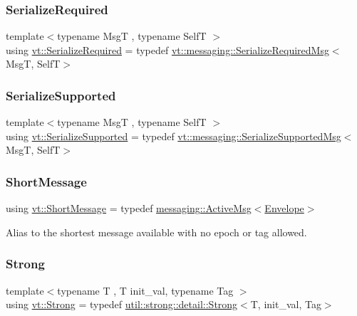 \subsubsection{\texorpdfstring{Serialize\+Required}{SerializeRequired}}
{\footnotesize\ttfamily template$<$typename MsgT , typename SelfT $>$ \\
using \hyperlink{namespacevt_a9e60e2e8929828639383ac1d6643384d}{vt\+::\+Serialize\+Required} = typedef \hyperlink{structvt_1_1messaging_1_1_serialize_required_msg}{vt\+::messaging\+::\+Serialize\+Required\+Msg}$<$MsgT, SelfT$>$}

\mbox{\label{namespacevt_a3862b8e3f67ab03f3a4313d828592fa9}} 
\subsubsection{\texorpdfstring{Serialize\+Supported}{SerializeSupported}}
{\footnotesize\ttfamily template$<$typename MsgT , typename SelfT $>$ \\
using \hyperlink{namespacevt_a3862b8e3f67ab03f3a4313d828592fa9}{vt\+::\+Serialize\+Supported} = typedef \hyperlink{structvt_1_1messaging_1_1_serialize_supported_msg}{vt\+::messaging\+::\+Serialize\+Supported\+Msg}$<$MsgT, SelfT$>$}

\mbox{\label{namespacevt_a1125ac1da6c0bbf141e0ea0739d7602d}} 
\subsubsection{\texorpdfstring{Short\+Message}{ShortMessage}}
{\footnotesize\ttfamily using \hyperlink{namespacevt_a1125ac1da6c0bbf141e0ea0739d7602d}{vt\+::\+Short\+Message} = typedef \hyperlink{structvt_1_1messaging_1_1_active_msg}{messaging\+::\+Active\+Msg}$<$\hyperlink{namespacevt_aa9c8cc094b5361482021d63012987814}{Envelope}$>$}



Alias to the shortest message available with no epoch or tag allowed. 

\mbox{\label{namespacevt_adbd3338278905742eb2de6db590fd2f1}} 
\subsubsection{\texorpdfstring{Strong}{Strong}}
{\footnotesize\ttfamily template$<$typename T , T init\+\_\+val, typename Tag $>$ \\
using \hyperlink{namespacevt_adbd3338278905742eb2de6db590fd2f1}{vt\+::\+Strong} = typedef \hyperlink{structvt_1_1util_1_1strong_1_1detail_1_1_strong}{util\+::strong\+::detail\+::\+Strong}$<$T, init\+\_\+val, Tag$>$}



